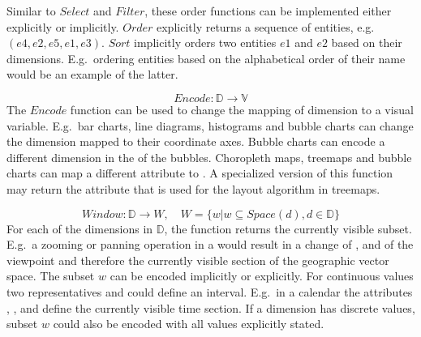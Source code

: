   Similar to $Select$ and $Filter$, these order functions can be implemented either explicitly or implicitly.
  $Order$ explicitly returns a sequence of entities, e.g.\ $(e4, e2, e5, e1, e3)$.
  $Sort$ implicitly orders two entities $e1$ and $e2$ based on their dimensions.
  E.g.\ ordering entities based on the alphabetical order of their name would be an example of the latter.

\begin{equation} Encode: \mathbb{D} \rightarrow \mathbb{V} \end{equation}
  The $Encode$ function can be used to change the mapping of dimension to a visual variable.
  E.g.\ bar charts, line diagrams, histograms and bubble charts can change the dimension mapped to their coordinate axes.
  Bubble charts can encode a different dimension in the  of the bubbles.
  Choropleth maps, treemaps and bubble charts can map a different attribute to .
  A specialized version of this function may return the attribute that is used for the layout algorithm in treemaps.

\begin{equation} Window: \mathbb{D} \rightarrow W, \quad W = \{w | w \subseteq Space(d), d \in \mathbb{D}\} \end{equation}
  For each of the dimensions in $\mathbb{D}$, the function returns the currently visible subset.
  E.g.\ a zooming or panning operation in a \gv{} would result in a change of ,  and  of the viewpoint and therefore the currently visible section of the geographic vector space.
  The subset $w$ can be encoded implicitly or explicitly.
  For continuous values two representatives  and  could define an interval.
  E.g.\ in a calendar the attributes , ,  and  define the currently visible time section.
  If a dimension has discrete values, subset $w$ could also be encoded with all values explicitly stated.







